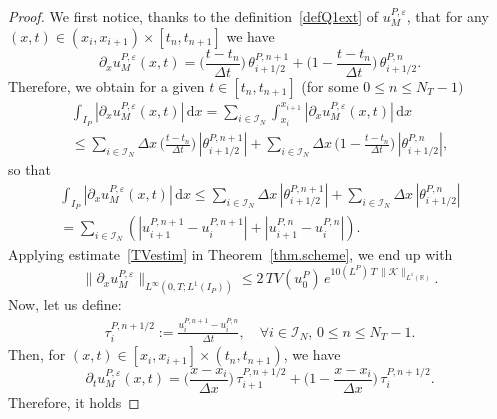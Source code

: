 \documentclass[11pt]{amsart}
\newcommand{\K}{\mathcal{K}}
\newcommand{\dd}{\mathrm{d}}
\newcommand{\I}{\mathcal{I}_N}
\newcommand{\eps}{\varepsilon}
\begin{document}
\begin{proof}
We first notice, thanks to the definition~\eqref{defQ1ext} of $u^{P,\eps}_M$, that for any $(x,t) \in (x_i,x_{i+1}) \times [t_n , t_{n+1}]$ we have
\begin{equation}\label{uepsilonx}
\partial_x u^{P, \eps}_{M} (x,t) = \bigg(\frac{t - t_n}{\Delta t}\bigg) \,\theta_{i +1/2}^{P, n + 1} + \bigg(1 - \frac{t - t_n}{\Delta t}\bigg) \, \theta_{i +1/2}^{P, n }.
\end{equation}
Therefore, we obtain for a given $t \in [t_n, t_{n + 1}]$ (for some $0\leq n \leq N_T-1)$
\begin{multline*}
\int_{I_P} \left|\partial_x u^{P, \eps}_{M}(x,t)\right|\, \dd x = \sum_{i \in \I} \int_{x_i}^{x_{i + 1}} \left|\partial_x u^{P,\eps}_M(x,t)\right|\, \dd x\\ 
\leq \sum_{i\in \I}  \Delta x\, \bigg(\frac{t - t_n}{\Delta t}\bigg)\, \left|\theta_{i +1/2}^{P, n + 1}\right| + \sum_{i\in \I} \Delta x \, \bigg(1 - \frac{t - t_n}{\Delta t}\bigg) \, \left|\theta_{i +1/2}^{P, n }\right|,
\end{multline*}
so that
\begin{multline*}
     \int_{I_P} \left|\partial_x u^{P, \eps}_{M}(x,t)\right|\, \dd x \leq \sum_{i\in \I} \Delta x \, \left|\theta_{i +1/2}^{P, n + 1}\right| + \sum_{i\in \I} \Delta x \, \left|\theta_{i +1/2}^{P, n }\right| \\
     = \sum_{i\in\I} \left(\left|u^{P,n+1}_{i+1}-u^{P,n+1}_i\right|+\left|u^{P,n}_{i+1}-u^{P,n}_i\right|\right).
\end{multline*}
Applying estimate~\eqref{TVestim} in Theorem~\ref{thm.scheme}, we end up with
\begin{equation}\label{bounded ux}
\|\partial_x u^{P, \eps}_M\|_{L^{\infty}(0, T; L^1(I_P))} \leq 2\, TV\left(u^P_0\right) \,e^{10(L^P) \, T \, \|\K\|_{L^1(\mathbb{R})}}.
\end{equation}
Now, let us define:
\begin{align}\label{def.tau}
\tau_i^{P, n +1/2} := \frac{u_i^{P, n + 1} - u_i^{P, n}}{\Delta t}, \quad \forall i \in \I, \, 0\leq n \leq N_T-1. 
\end{align}
Then, for $(x,t) \in [x_i,x_{i+1}] \times (t_n, t_{n + 1})$, we have
\begin{equation}\label{decompo.patuPeps}
\partial_t u^{P, \eps}_M(x,t) = \bigg(\frac{x - x_i}{\Delta x}\bigg) \, \tau_{i + 1}^{P, n +1/2}+\bigg( 1 - \frac{x - x_i}{\Delta x}\bigg)\, \tau_i^{P, n +1/2}. 
\end{equation}
Therefore, it holds

\end{proof}
\end{document}
